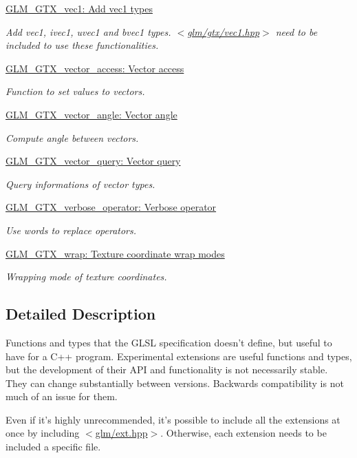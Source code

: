 \begin{DoxyCompactItemize}
\hyperlink{group__gtx__vec1}{\-G\-L\-M\-\_\-\-G\-T\-X\-\_\-vec1\-: Add vec1 types}
\begin{DoxyCompactList}\small\item\em \-Add vec1, ivec1, uvec1 and bvec1 types. $<$\hyperlink{vec1_8hpp}{glm/gtx/vec1.\-hpp}$>$ need to be included to use these functionalities. \end{DoxyCompactList}\item 
\hyperlink{group__gtx__vector__access}{\-G\-L\-M\-\_\-\-G\-T\-X\-\_\-vector\-\_\-access\-: Vector access}
\begin{DoxyCompactList}\small\item\em \-Function to set values to vectors. \end{DoxyCompactList}\item 
\hyperlink{group__gtx__vector__angle}{\-G\-L\-M\-\_\-\-G\-T\-X\-\_\-vector\-\_\-angle\-: Vector angle}
\begin{DoxyCompactList}\small\item\em \-Compute angle between vectors. \end{DoxyCompactList}\item 
\hyperlink{group__gtx__vector__query}{\-G\-L\-M\-\_\-\-G\-T\-X\-\_\-vector\-\_\-query\-: Vector query}
\begin{DoxyCompactList}\small\item\em \-Query informations of vector types. \end{DoxyCompactList}\item 
\hyperlink{group__gtx__verbose__operator}{\-G\-L\-M\-\_\-\-G\-T\-X\-\_\-verbose\-\_\-operator\-: Verbose operator}
\begin{DoxyCompactList}\small\item\em \-Use words to replace operators. \end{DoxyCompactList}\item 
\hyperlink{group__gtx__wrap}{\-G\-L\-M\-\_\-\-G\-T\-X\-\_\-wrap\-: Texture coordinate wrap modes}
\begin{DoxyCompactList}\small\item\em \-Wrapping mode of texture coordinates. \end{DoxyCompactList}\end{DoxyCompactItemize}


\subsection{\-Detailed \-Description}
\-Functions and types that the \-G\-L\-S\-L specification doesn't define, but useful to have for a \-C++ program. \-Experimental extensions are useful functions and types, but the development of their \-A\-P\-I and functionality is not necessarily stable. \-They can change substantially between versions. \-Backwards compatibility is not much of an issue for them.

\-Even if it's highly unrecommended, it's possible to include all the extensions at once by including $<$\hyperlink{ext_8hpp_source}{glm/ext.\-hpp}$>$. \-Otherwise, each extension needs to be included a specific file. 